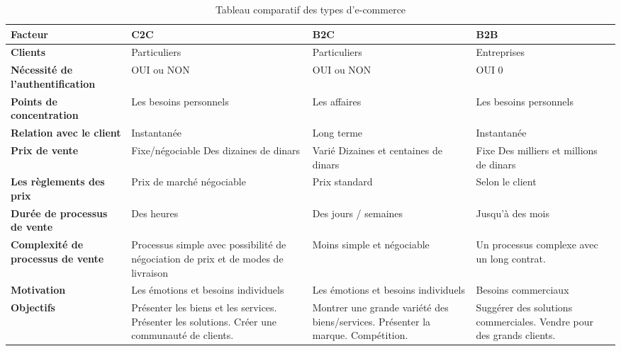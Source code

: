 \begin{table}[H]
    \captionsetup{justification=centering}
    \caption{  \label{tab:UC-ATH} Tableau comparatif des types d'e-commerce}
    \centering
    \begin{tabular} {|m{8em}|m{10em}|m{10em}|m{7em}|}
    \hline
    \textbf{Facteur} & \textbf{C2C} & \textbf{B2C} & \textbf{B2B} \\
    \hline
    \textbf{Clients} & Particuliers & Particuliers & Entreprises \\
    \hline
    \textbf{Nécessité de l'authentification} & OUI ou NON & OUI ou NON & OUI 0\\
    \hline
    \textbf{Points de concentration} & Les besoins personnels & Les affaires & Les besoins personnels \\
    \hline
    \textbf{Relation avec le client} & Instantanée & Long terme & Instantanée \\
    \hline
    \textbf{Prix de vente} & Fixe/négociable \linebreak Des dizaines de dinars
                            & Varié \linebreak Dizaines et centaines de dinars & Fixe \linebreak Des milliers et millions de dinars \\
    \hline
    \textbf{Les règlements des prix} & Prix de marché négociable & Prix standard & Selon le client \\ \hline
    \textbf{Durée de processus de vente} & Des heures & Des jours / semaines & Jusqu’à des mois \\ \hline
    \textbf{Complexité de processus de vente} & Processus simple avec possibilité de négociation de prix et de modes de livraison & Moins simple et négociable & Un processus complexe avec un long contrat. \\ \hline
    \textbf{Motivation} & Les émotions et besoins individuels & Les émotions et besoins individuels & Besoins commerciaux \\ \hline
    \textbf{Objectifs} &    Présenter les biens et les services. \linebreak
                            Présenter les solutions.\linebreak
                            Créer une communauté de clients.
                            & Montrer une grande variété des biens/services. \linebreak
                            Présenter la marque.\linebreak
                            Compétition.
                            & Suggérer des solutions commerciales. \linebreak
                            Vendre pour des grands clients.\\
    \hline
    \end{tabular}
    \end{table}
